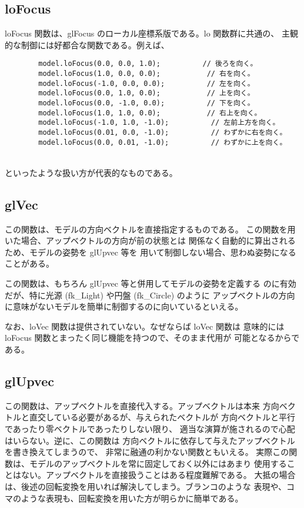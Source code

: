 \subsection{loFocus}
loFocus 関数は、glFocus のローカル座標系版である。lo 関数群に共通の、
主観的な制御には好都合な関数である。例えば、
\\
\begin{breakbox}
\begin{verbatim}
        model.loFocus(0.0, 0.0, 1.0);          // 後ろを向く。
        model.loFocus(1.0, 0.0, 0.0);           // 右を向く。
        model.loFocus(-1.0, 0.0, 0.0);          // 左を向く。
        model.loFocus(0.0, 1.0, 0.0);           // 上を向く。
        model.loFocus(0.0, -1.0, 0.0);          // 下を向く。
        model.loFocus(1.0, 1.0, 0.0);           // 右上を向く。
        model.loFocus(-1.0, 1.0, -1.0);          // 左前上方を向く。
        model.loFocus(0.01, 0.0, -1.0);          // わずかに右を向く。
        model.loFocus(0.0, 0.01, -1.0);          // わずかに上を向く。
\end{verbatim}
\end{breakbox}
~ \\
といったような扱い方が代表的なものである。
\subsection{glVec}
この関数は、モデルの方向ベクトルを直接指定するものである。
この関数を用いた場合、アップベクトルの方向が前の状態とは
関係なく自動的に算出されるため、モデルの姿勢を glUpvec 等を
用いて制御しない場合、思わぬ姿勢になることがある。

この関数は、もちろん glUpvec 等と併用してモデルの姿勢を定義する
のに有効だが、特に光源 (fk\_Light) や円盤 (fk\_Circle) のように
アップベクトルの方向に意味がないモデルを簡単に制御するのに向いているといえる。

なお、loVec 関数は提供されていない。なぜならば loVec 関数は
意味的には loFocus 関数とまったく同じ機能を持つので、そのまま代用が
可能となるからである。
\subsection{glUpvec}
この関数は、アップベクトルを直接代入する。アップベクトルは本来
方向ベクトルと直交している必要があるが、与えられたベクトルが
方向ベクトルと平行であったり零ベクトルであったりしない限り、
適当な演算が施されるので心配はいらない。逆に、この関数は
方向ベクトルに依存して与えたアップベクトルを書き換えてしまうので、
非常に融通の利かない関数ともいえる。
実際この関数は、モデルのアップベクトルを常に固定しておく以外にはあまり
使用することはない。アップベクトルを直接扱うことはある程度難解である。
大抵の場合は、後述の回転変換を用いれば解決してしまう。ブランコのような
表現や、コマのような表現も、回転変換を用いた方が明らかに簡単である。

